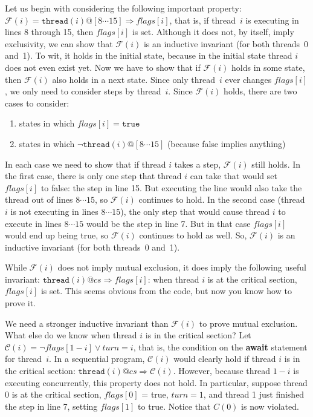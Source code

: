 \documentclass{report}
\begin{document}
Let us begin with considering the following important property:
$\mathcal{F}(i) = \mathtt{thread}(i)@[8 \cdots 15] \Rightarrow \mathit{flags}[i]$,
that is, if thread~$i$ is executing in lines 8 through 15, then $\mathit{flags}[i]$
is set.
Although it does not, by itself, imply exclusivity, we can show that
$\mathcal{F}(i)$ is an inductive invariant (for both threads~0 and~1).
To wit, it holds in the initial state, because in the initial state thread $i$ does
not even exist yet.
Now we have to show that if $\mathcal{F}(i)$ holds in some state, then
$\mathcal{F}(i)$ also holds in a next state.
Since only thread~$i$ ever changes $\mathit{flags}[i]$, we only need to
consider steps by thread~$i$.
Since $\mathcal{F}(i)$ holds, there are two cases to consider:
\begin{enumerate}
\item states in which $\mathit{flags}[i] = \texttt{true}$
\item states in which $\lnot \mathtt{thread}(i)@[8 \cdots 15]$
(because false implies anything)
\end{enumerate}
In each case we need to show that if thread $i$ takes a step, 
$\mathcal{F}(i)$ still holds.
In the first case, there is only one step that thread $i$ can take that would
set $\mathit{flags}[i]$ to false: the step in line 15.  But executing the line
would also take the thread out of lines $8 \cdots 15$, so $\mathcal{F}(i)$ continues to hold.
In the second case (thread $i$ is not executing in lines $8 \cdots 15$), the only step
that would cause thread $i$ to execute in lines $8 \cdots 15$ would be the step in line 7.
But in that case $\mathit{flags}[i]$ would end up being true, so
$\mathcal{F}(i)$ continues to hold as well.
So, $\mathcal{F}(i)$ is an inductive invariant (for both threads~0 and~1).

While $\mathcal{F}(i)$ does not imply mutual exclusion, it does imply the following useful
invariant: $\mathtt{thread}(i)@cs \Rightarrow \mathit{flags}[i]$: when thread $i$ is
at the critical section, $\mathit{flags}[i]$ is set.  This seems obvious from the code,
but now you know how to prove it.

We need a stronger inductive invariant than $\mathcal{F}(i)$ to prove mutual exclusion.
What else do we know when thread $i$ is in the critical section?
Let $\mathcal{C}(i) = \lnot\mathit{flags}[1 - i] \lor \mathit{turn} = i$, that is,
the condition on the \textbf{await} statement for thread~$i$.
In a sequential program, $\mathcal{C}(i)$ would clearly hold if thread $i$ is in
the critical section: $\mathtt{thread}(i)@cs \Rightarrow \mathcal{C}(i)$.
However, because thread $1-i$ is executing concurrently, this property does not
hold.  In particular, suppose thread 0 is at the critical section, $\mathit{flags}[0]$ = true,
$\mathit{turn} = 1$, and thread 1 just finished the step in line 7,
setting $\mathit{flags}[1]$ to true.  Notice that $C(0)$ is now violated.
\end{document}
